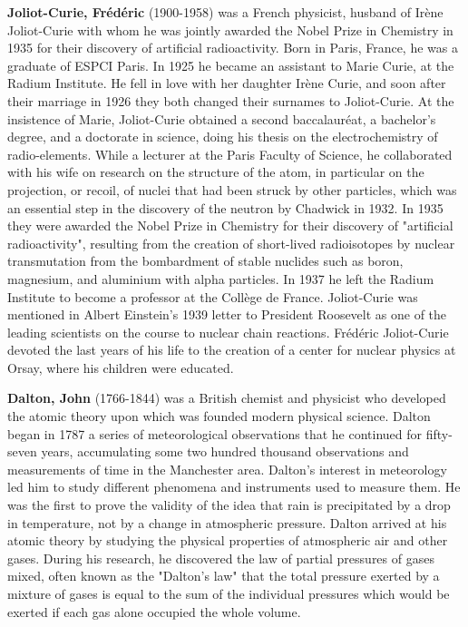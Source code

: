 \textbf{Joliot-Curie, Frédéric} (1900-1958) was a French physicist, husband of Irène Joliot-Curie with whom he was jointly awarded the Nobel Prize in Chemistry in 1935 for their discovery of artificial radioactivity. Born in Paris, France, he was a graduate of ESPCI Paris. In 1925 he became an assistant to Marie Curie, at the Radium Institute. He fell in love with her daughter Irène Curie, and soon after their marriage in 1926 they both changed their surnames to Joliot-Curie. At the insistence of Marie, Joliot-Curie obtained a second baccalauréat, a bachelor's degree, and a doctorate in science, doing his thesis on the electrochemistry of radio-elements. While a lecturer at the Paris Faculty of Science, he collaborated with his wife on research on the structure of the atom, in particular on the projection, or recoil, of nuclei that had been struck by other particles, which was an essential step in the discovery of the neutron by Chadwick in 1932. In 1935 they were awarded the Nobel Prize in Chemistry for their discovery of "artificial radioactivity", resulting from the creation of short-lived radioisotopes by nuclear transmutation from the bombardment of stable nuclides such as boron, magnesium, and aluminium with alpha particles. In 1937 he left the Radium Institute to become a professor at the Collège de France. Joliot-Curie was mentioned in Albert Einstein's 1939 letter to President Roosevelt as one of the leading scientists on the course to nuclear chain reactions. Frédéric Joliot-Curie devoted the last years of his life to the creation of a center for nuclear physics at Orsay, where his children were educated.

{}
\label{sec:D}	

\textbf{Dalton, John} (1766-1844) was a British chemist and physicist who developed the atomic theory upon which was founded modern physical science. Dalton began in 1787 a series of meteorological observations that he continued for fifty-seven years, accumulating some two hundred thousand observations and measurements of time in the Manchester area. Dalton's interest in meteorology led him to study different phenomena and instruments used to measure them. He was the first to prove the validity of the idea that rain is precipitated by a drop in temperature, not by a change in atmospheric pressure. Dalton arrived at his atomic theory by studying the physical properties of atmospheric air and other gases. During his research, he discovered the law of partial pressures of gases mixed, often known as the "Dalton's law" that the total pressure exerted by a mixture of gases is equal to the sum of the individual pressures which would be exerted if each gas alone occupied the whole volume.


